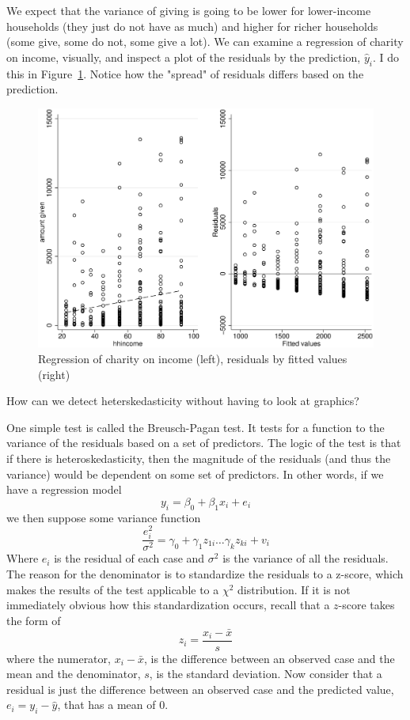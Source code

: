 We expect that the variance of giving is going to be lower for lower-income households (they just do not have as much) and higher for richer households (some give, some do not, some give a lot). We can examine a regression of charity on income, visually, and inspect a plot of the residuals by the prediction, $\hat{y}_i$. I do this in Figure~\ref{fig:hetcharity}. Notice how the "spread" of residuals differs based on the prediction.

\begin{figure}
   \centering
   \includegraphics[angle=0,
           width=.75\textwidth]{hetcharity.eps}
   \caption{Regression of charity on income (left), residuals by fitted values (right)}
  \label{fig:hetcharity}
\end{figure}

How can we detect heterskedasticity without having to look at graphics?

One simple test is called the Breusch-Pagan test. It tests for a function to the variance of the residuals based on a set of predictors. The logic of the test is that if there is heteroskedasticity, then the magnitude of the residuals (and thus the variance) would be dependent on some set of predictors. In other words, if we have a regression model
\[
y_i = \beta_0+\beta_1x_i+e_i
\]
we then suppose some variance function
\[
\frac{e_i^2}{\sigma^2}=\gamma_0+\gamma_1z_{1i}\ldots\gamma_kz_{ki}+v_i
\]
Where $e_i$ is the residual of each case and $\sigma^2$ is the variance of all the residuals. The reason for the denominator is to standardize the residuals to a z-score, which makes the results of the test applicable to a $\chi^2$ distribution. If it is not immediately obvious how this standardization occurs, recall that a $z$-score takes the form of
\[
z_i = \frac{x_i-\bar{x}}{s}
\]
where the numerator, $x_i-\bar{x}$, is the difference between an observed case and the mean and the denominator, $s$, is the standard deviation. Now consider that a residual is just the difference between an observed case and the predicted value, $e_i=y_i-\hat{y}$, that has a mean of 0.

